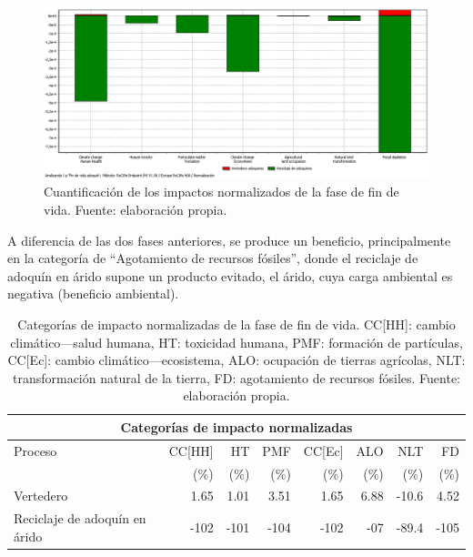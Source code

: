 \begin{figure}[!htb]
\centering
\includegraphics[width=15cm]{img/fdv_normalizacion.png}
\caption[Cuantificación de los impactos normalizados de la fase de fin de vida.]{Cuantificación de los impactos normalizados de la fase de fin de vida. Fuente: elaboración propia.}
\label{fig:fdv_normalizacion}
\end{figure}

A diferencia de las dos fases anteriores, se produce un beneficio, principalmente en la categoría de ``Agotamiento de recursos fósiles'', donde el reciclaje de adoquín en árido supone un producto evitado, el árido, cuya carga ambiental es negativa (beneficio ambiental).

\begin{table}[!htb]
\centering
\begin{tabular}{p{4cm}rrrrrrr}
\toprule
\multicolumn{8}{c}{Categorías de impacto normalizadas}\\
\midrule
Proceso & CC[HH] & HT & PMF & CC[Ec] & ALO & NLT & FD\\
 &  (\%) & (\%) & (\%) & (\%) & (\%) & (\%) & (\%)\\
\midrule
Vertedero & 1.65 & 1.01 & 3.51 & 1.65 & 6.88 & -10.6 & 4.52\\
Reciclaje de adoquín en árido & -102 & -101 & -104 & -102 & -07 & -89.4 & -105\\
\bottomrule
\end{tabular}
\caption[Categorías de impacto normalizadas de la fase de fin de vida.]{Categorías de impacto normalizadas de la fase de fin de vida. CC[HH]: cambio climático—salud humana, HT: toxicidad humana, PMF: formación de partículas, CC[Ec]: cambio climático—ecosistema, ALO: ocupación de tierras agrícolas, NLT: transformación natural de la tierra, FD: agotamiento de recursos fósiles. Fuente: elaboración propia.}
\label{categoriasimpactofdv}
\end{table}

